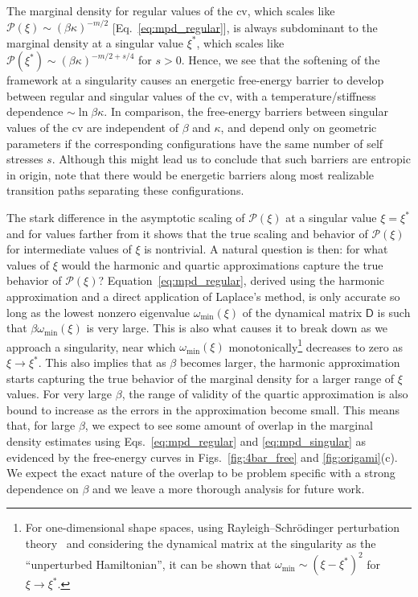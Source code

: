 The marginal density for regular values of the \ac{cv}, which scales like $\mathscr{P}(\xi) \sim (\beta\kappa)^{-m/2}$ [Eq.~\eqref{eq:mpd_regular}], is always subdominant to the marginal density at a singular value $\xi^{*}$, which scales like $\mathscr{P}(\xi^{*}) \sim (\beta\kappa)^{-m/2 + s/4}$ for $s > 0$.
Hence, we see that the softening of the framework at a singularity causes an energetic free-energy barrier to develop between regular and singular values of the \ac{cv}, with a temperature/stiffness dependence $\sim \ln \beta\kappa$.
In comparison, the free-energy barriers between singular values of the \ac{cv} are independent of $\beta$ and $\kappa$, and depend only on geometric parameters if the corresponding configurations have the same number of self stresses $s$.
Although this might lead us to conclude that such barriers are entropic in origin, note that there would be energetic barriers along most realizable transition paths separating these configurations.

The stark difference in the asymptotic scaling of $\mathscr{P}(\xi)$ at a singular value $\xi = \xi^{*}$ and for values farther from it shows that the true scaling and behavior of $\mathscr{P}(\xi)$ for intermediate values of $\xi$ is nontrivial.
A natural question is then: for what values of $\xi$ would the harmonic and quartic approximations capture the true behavior of $\mathscr{P}(\xi)$?
Equation~\eqref{eq:mpd_regular}, derived using the harmonic approximation and a direct application of Laplace's method, is only accurate so long as the lowest nonzero eigenvalue $\omega_{\text{min}}(\xi)$ of the dynamical matrix $\mathsf{D}$ is such that $\beta\omega_{\text{min}}(\xi)$ is very large.
This is also what causes it to break down as we approach a singularity, near which $\omega_{\text{min}}(\xi)$ monotonically\footnote{For one-dimensional shape spaces, using Rayleigh--Schr\"{o}dinger perturbation theory~\cite{dirac1958} and considering the dynamical matrix at the singularity as the ``unperturbed Hamiltonian'', it can be shown that $\omega_{\text{min}} \sim (\xi - \xi^{*})^{2}$ for $\xi \to \xi^{*}$.} decreases to zero as $\xi \to \xi^{*}$.
This also implies that as $\beta$ becomes larger, the harmonic approximation starts capturing the true behavior of the marginal density for a larger range of $\xi$ values.
For very large $\beta$, the range of validity of the quartic approximation is also bound to increase as the errors in the approximation become small.
This means that, for large $\beta$, we expect to see some amount of overlap in the marginal density estimates using Eqs.~\eqref{eq:mpd_regular} and \eqref{eq:mpd_singular} as evidenced by the free-energy curves in Figs.~\ref{fig:4bar_free} and \ref{fig:origami}(c).
We expect the exact nature of the overlap to be problem specific with a strong dependence on $\beta$ and we leave a more thorough analysis for future work.

